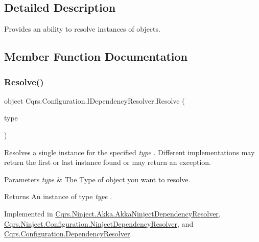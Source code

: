 \subsection{Detailed Description}
Provides an ability to resolve instances of objects. 



\subsection{Member Function Documentation}
\mbox{\label{interfaceCqrs_1_1Configuration_1_1IDependencyResolver_aa455096b7b94fc1d64904bc67830ec06_aa455096b7b94fc1d64904bc67830ec06}} 
\subsubsection{\texorpdfstring{Resolve()}{Resolve()}}
{\footnotesize\ttfamily object Cqrs.\+Configuration.\+I\+Dependency\+Resolver.\+Resolve (\begin{DoxyParamCaption}\item[{Type}]{type }\end{DoxyParamCaption})}



Resolves a single instance for the specified {\itshape type} . Different implementations may return the first or last instance found or may return an exception. 


\begin{DoxyParams}{Parameters}
{\em type} & The Type of object you want to resolve.\\
\hline
\end{DoxyParams}
\begin{DoxyReturn}{Returns}
An instance of type {\itshape type} .
\end{DoxyReturn}


Implemented in \hyperlink{classCqrs_1_1Ninject_1_1Akka_1_1AkkaNinjectDependencyResolver_adace29de71f10e34e952bd41e48106a6_adace29de71f10e34e952bd41e48106a6}{Cqrs.\+Ninject.\+Akka.\+Akka\+Ninject\+Dependency\+Resolver}, \hyperlink{classCqrs_1_1Ninject_1_1Configuration_1_1NinjectDependencyResolver_ab9da7f1556cc1ef205d03d3ff62017c0_ab9da7f1556cc1ef205d03d3ff62017c0}{Cqrs.\+Ninject.\+Configuration.\+Ninject\+Dependency\+Resolver}, and \hyperlink{classCqrs_1_1Configuration_1_1DependencyResolver_aaeeb3ad2e0ef44bd98469d843210205c_aaeeb3ad2e0ef44bd98469d843210205c}{Cqrs.\+Configuration.\+Dependency\+Resolver}.

